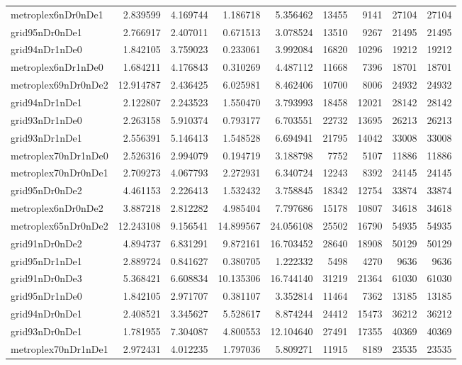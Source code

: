 \begin{longtable}{|l|r|r|r|r|r|r|r|r|}
metroplex6nDr0nDe1 & 2.839599 & 4.169744 & 1.186718 & 5.356462 & 13455 & 9141 & 27104 & 27104 \\
grid95nDr0nDe1 & 2.766917 & 2.407011 & 0.671513 & 3.078524 & 13510 & 9267 & 21495 & 21495 \\
grid94nDr1nDe0 & 1.842105 & 3.759023 & 0.233061 & 3.992084 & 16820 & 10296 & 19212 & 19212 \\
metroplex6nDr1nDe0 & 1.684211 & 4.176843 & 0.310269 & 4.487112 & 11668 & 7396 & 18701 & 18701 \\
metroplex69nDr0nDe2 & 12.914787 & 2.436425 & 6.025981 & 8.462406 & 10700 & 8006 & 24932 & 24932 \\
grid94nDr1nDe1 & 2.122807 & 2.243523 & 1.550470 & 3.793993 & 18458 & 12021 & 28142 & 28142 \\
grid93nDr1nDe0 & 2.263158 & 5.910374 & 0.793177 & 6.703551 & 22732 & 13695 & 26213 & 26213 \\
grid93nDr1nDe1 & 2.556391 & 5.146413 & 1.548528 & 6.694941 & 21795 & 14042 & 33008 & 33008 \\
metroplex70nDr1nDe0 & 2.526316 & 2.994079 & 0.194719 & 3.188798 & 7752 & 5107 & 11886 & 11886 \\
metroplex70nDr0nDe1 & 2.709273 & 4.067793 & 2.272931 & 6.340724 & 12243 & 8392 & 24145 & 24145 \\
grid95nDr0nDe2 & 4.461153 & 2.226413 & 1.532432 & 3.758845 & 18342 & 12754 & 33874 & 33874 \\
metroplex6nDr0nDe2 & 3.887218 & 2.812282 & 4.985404 & 7.797686 & 15178 & 10807 & 34618 & 34618 \\
metroplex65nDr0nDe2 & 12.243108 & 9.156541 & 14.899567 & 24.056108 & 25502 & 16790 & 54935 & 54935 \\
grid91nDr0nDe2 & 4.894737 & 6.831291 & 9.872161 & 16.703452 & 28640 & 18908 & 50129 & 50129 \\
grid95nDr1nDe1 & 2.889724 & 0.841627 & 0.380705 & 1.222332 & 5498 & 4270 & 9636 & 9636 \\
grid91nDr0nDe3 & 5.368421 & 6.608834 & 10.135306 & 16.744140 & 31219 & 21364 & 61030 & 61030 \\
grid95nDr1nDe0 & 1.842105 & 2.971707 & 0.381107 & 3.352814 & 11464 & 7362 & 13185 & 13185 \\
grid94nDr0nDe1 & 2.408521 & 3.345627 & 5.528617 & 8.874244 & 24412 & 15473 & 36212 & 36212 \\
grid93nDr0nDe1 & 1.781955 & 7.304087 & 4.800553 & 12.104640 & 27491 & 17355 & 40369 & 40369 \\
metroplex70nDr1nDe1 & 2.972431 & 4.012235 & 1.797036 & 5.809271 & 11915 & 8189 & 23535 & 23535 \\

\end{longtable}
